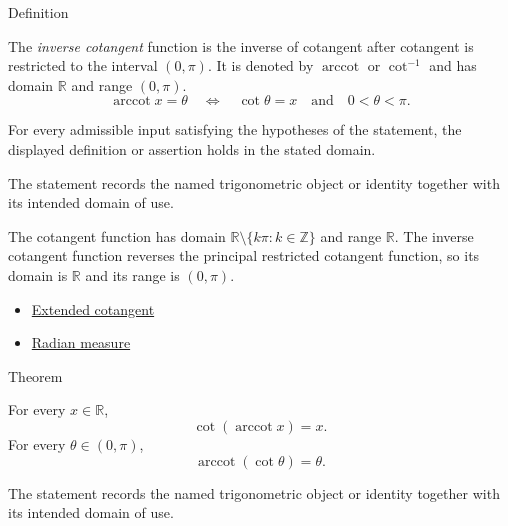 

\begin{definitionbox}{Definition}
\begin{definition}
\label{def:inverse-cotangent}
The \emph{inverse cotangent} function is the inverse of cotangent after
cotangent is restricted to the interval $(0,\pi)$. It is denoted by $\operatorname{arccot}$
or $\cot^{-1}$ and has domain $\mathbb{R}$ and range $(0,\pi)$.
\[
  \operatorname{arccot} x=\theta
  \quad\Longleftrightarrow\quad
  \cot\theta=x
  \quad\text{and}\quad
  0<\theta<\pi.
\]
\end{definition}
\end{definitionbox}
\begin{remark*}
For every admissible input satisfying the hypotheses of the statement, the
displayed definition or assertion holds in the stated domain.
\end{remark*}

\begin{remark*}[Interpretation]
The statement records the named trigonometric object or identity together with
its intended domain of use.
\end{remark*}

\begin{remark*}
The cotangent function has domain
$\mathbb{R}\setminus\{k\pi:k\in\mathbb{Z}\}$ and range $\mathbb{R}$. The
inverse cotangent function reverses the principal restricted cotangent
function, so its domain is $\mathbb{R}$ and its range is $(0,\pi)$.
\end{remark*}
\begin{dependencies}
\begin{itemize}
  \item \hyperref[def:extended-cotangent]{Extended cotangent}
  \item \hyperref[def:radian-measure]{Radian measure}
\end{itemize}
\end{dependencies}

\begin{theorembox}{Theorem}
\begin{theorem}
\label{thm:inverse-cotangent-identities}
For every $x\in\mathbb{R}$,
\[
  \cot(\operatorname{arccot} x)=x.
\]
For every $\theta\in(0,\pi)$,
\[
  \operatorname{arccot}(\cot\theta)=\theta.
\]
\end{theorem}
\end{theorembox}
\begin{remark*}[Interpretation]
The statement records the named trigonometric object or identity together with
its intended domain of use.
\end{remark*}

